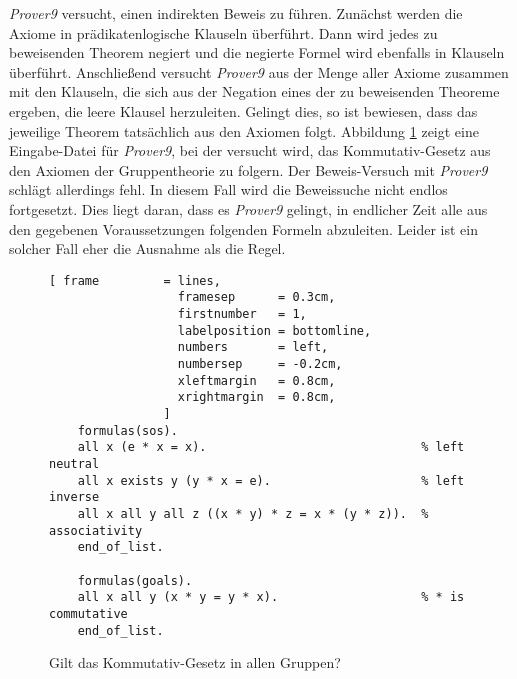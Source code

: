 \textsl{Prover9} versucht, einen indirekten Beweis zu f\"{u}hren.  Zun\"{a}chst werden die Axiome in
pr\"{a}dikatenlogische Klauseln 
\"{u}berf\"{u}hrt. Dann wird jedes zu beweisenden Theorem negiert und die negierte Formel wird ebenfalls in 
Klauseln \"{u}berf\"{u}hrt.  Anschlie\ss{}end versucht \textsl{Prover9} aus der Menge aller Axiome zusammen mit den
Klauseln, die sich aus der Negation eines der zu beweisenden Theoreme ergeben, die leere
Klausel herzuleiten.  Gelingt dies, so ist bewiesen, dass das jeweilige  Theorem tats\"{a}chlich aus den Axiomen
folgt.   Abbildung \ref{fig:group-commutative.in} zeigt eine
Eingabe-Datei f\"{u}r \textsl{Prover9}, bei der versucht wird, das Kommutativ-Gesetz aus den Axiomen der
Gruppentheorie zu folgern.  Der Beweis-Versuch mit \textsl{Prover9} schl\"{a}gt allerdings fehl.  In diesem Fall
wird die Beweissuche nicht endlos fortgesetzt.  Dies liegt daran, dass es \textsl{Prover9} gelingt, in
endlicher Zeit alle aus den gegebenen Voraussetzungen folgenden Formeln abzuleiten.
Leider ist ein solcher Fall eher die Ausnahme als die Regel.

\begin{figure}[!ht]
\centering
\begin{Verbatim}[ frame         = lines, 
                  framesep      = 0.3cm, 
                  firstnumber   = 1,
                  labelposition = bottomline,
                  numbers       = left,
                  numbersep     = -0.2cm,
                  xleftmargin   = 0.8cm,
                  xrightmargin  = 0.8cm,
                ]
    formulas(sos).
    all x (e * x = x).                              % left neutral 
    all x exists y (y * x = e).                     % left inverse
    all x all y all z ((x * y) * z = x * (y * z)).  % associativity
    end_of_list.
    
    formulas(goals).
    all x all y (x * y = y * x).                    % * is commutative
    end_of_list.
\end{Verbatim}
\vspace*{-0.3cm}
\caption{Gilt das Kommutativ-Gesetz in allen Gruppen?}
\label{fig:group-commutative.in}
\end{figure}


